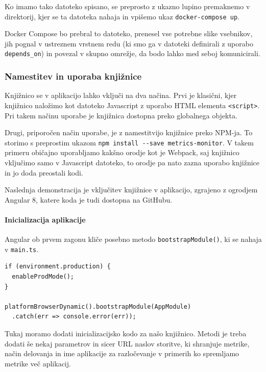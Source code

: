 \documentclass[a4paper, 12pt]{book}
\begin{document}
Ko imamo tako datoteko spisano, se preprosto z ukazno lupino premaknemo v direktorij, kjer se ta datoteka nahaja in vpišemo ukaz \verb|docker-compose up|.

Docker Compose bo prebral to datoteko, prenesel vse potrebne slike vsebnikov, jih pognal v ustreznem vrstnem redu (ki smo ga v datoteki definirali z uporabo \verb|depends_on|) in povezal v skupno omrežje, da bodo lahko med seboj komunicirali.

\subsubsection{Namestitev in uporaba knjižnice}

Knjižnico se v aplikacijo lahko vključi na dva načina. Prvi je klasični, kjer knjižnico naložimo kot datoteko Javascript z uporabo HTML elementa \verb|<script>|. Pri takem načinu uporabe je knjižnica dostopna preko globalnega objekta.

Drugi, priporočen način uporabe, je z namestitvijo knjižnice preko NPM-ja. To storimo s preprostim ukazom \verb|npm install --save metrics-monitor|. V takem primeru običajno uporabljamo kakšno orodje kot je Webpack, saj knjižnico vključimo samo v Javascript datoteko, to orodje pa nato zazna uporabo knjižnice in jo doda preostali kodi.

Naslednja demonstracija je vključitev knjižnice v aplikacijo, zgrajeno z ogrodjem Angular 8, katere koda je tudi dostopna na GitHubu.

\paragraph{Inicializacija aplikacije} 
Angular ob prvem zagonu kliče posebno metodo \verb|bootstrapModule()|, ki se nahaja v \verb|main.ts|.

\begin{lstlisting}[label=code:lib_main_ts, caption=Zagon Angular aplikacije]
if (environment.production) {
  enableProdMode();
}

platformBrowserDynamic().bootstrapModule(AppModule)
  .catch(err => console.error(err));
\end{lstlisting}

Tukaj moramo dodati inicializacijsko kodo za našo knjižnico. Metodi je treba dodati še nekaj parametrov in sicer URL naslov storitve, ki shranjuje metrike, način delovanja in ime aplikacije za razločevanje v primerih ko spremljamo metrike več aplikacij. \\
\end{document}
